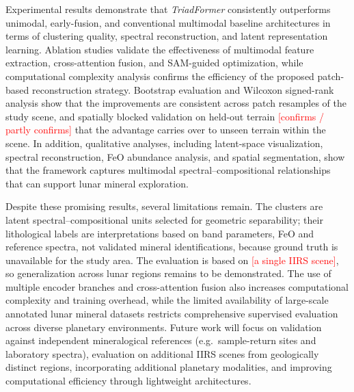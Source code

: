 \documentclass[pdflatex,sn-mathphys-num]{sn-jnl}
\newcommand{\fillin}[1]{\textcolor{red}{[#1]}}
\begin{document}
Experimental results demonstrate that \textit{TriadFormer} consistently outperforms unimodal, early-fusion, and conventional multimodal baseline architectures in terms of clustering quality, spectral reconstruction, and latent representation learning. Ablation studies validate the effectiveness of multimodal feature extraction, cross-attention fusion, and SAM-guided optimization, while computational complexity analysis confirms the efficiency of the proposed patch-based reconstruction strategy. Bootstrap evaluation and Wilcoxon signed-rank analysis show that the improvements are consistent across patch resamples of the study scene, and spatially blocked validation on held-out terrain \fillin{confirms / partly confirms} that the advantage carries over to unseen terrain within the scene. In addition, qualitative analyses, including latent-space visualization, spectral reconstruction, FeO abundance analysis, and spatial segmentation, show that the framework captures multimodal spectral--compositional relationships that can support lunar mineral exploration.

Despite these promising results, several limitations remain. The clusters are latent spectral--compositional units selected for geometric separability; their lithological labels are interpretations based on band parameters, FeO and reference spectra, not validated mineral identifications, because ground truth is unavailable for the study area. The evaluation is based on \fillin{a single IIRS scene}, so generalization across lunar regions remains to be demonstrated. The use of multiple encoder branches and cross-attention fusion also increases computational complexity and training overhead, while the limited availability of large-scale annotated lunar mineral datasets restricts comprehensive supervised evaluation across diverse planetary environments. Future work will focus on validation against independent mineralogical references (e.g.\ sample-return sites and laboratory spectra), evaluation on additional IIRS scenes from geologically distinct regions, incorporating additional planetary modalities, and improving computational efficiency through lightweight architectures.


\end{document}

